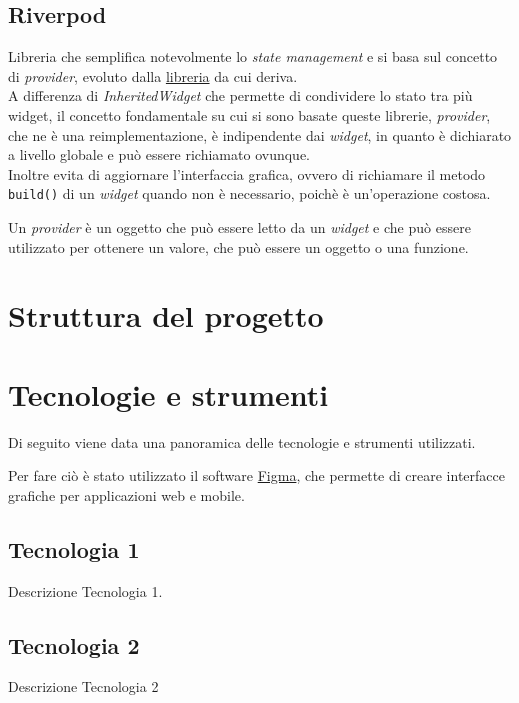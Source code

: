 \subsection{Riverpod}
\label{subsec:riverpod}

Libreria che semplifica notevolmente lo \emph{state management} e si basa sul concetto di \emph{provider}, evoluto dalla \href{https://pub.dev/packages/provider}{libreria} da cui deriva.\\
A differenza di \emph{InheritedWidget} che permette di condividere lo stato tra più widget, il concetto fondamentale su cui si sono basate queste librerie, \emph{provider}, che ne è una reimplementazione, è indipendente dai \emph{widget}, in quanto è dichiarato a livello globale e può essere richiamato ovunque.\\
Inoltre evita di aggiornare l'interfaccia grafica, ovvero di richiamare il metodo \lstinline{build()} di un \emph{widget} quando non è necessario, poichè è un'operazione costosa.

Un \emph{provider} è un oggetto che può essere letto da un \emph{widget} e che può essere utilizzato per ottenere un valore, che può essere un oggetto o una funzione.\\

\section{Struttura del progetto}
\label{sec:struttura-progetto}




\section{Tecnologie e strumenti}
\label{sec:tecnologie-strumenti}
Di seguito viene data una panoramica delle tecnologie e strumenti utilizzati.

Per fare ciò è stato utilizzato il software \href{https://www.figma.com/}{Figma}, che permette di creare interfacce grafiche per applicazioni web e mobile.\\

\subsection*{Tecnologia 1}
Descrizione Tecnologia 1.

\subsection*{Tecnologia 2}
Descrizione Tecnologia 2